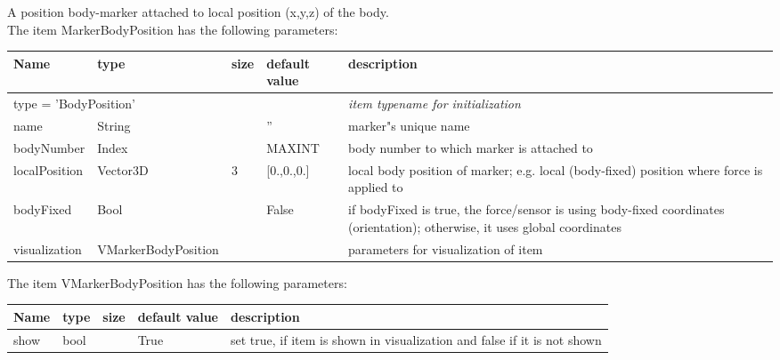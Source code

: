 A position body-marker attached to local position (x,y,z) of the body.
 \\The item MarkerBodyPosition has the following parameters:
\begin{center}
  \footnotesize
  \begin{longtable}{| p{4.5cm} | p{2.5cm} | p{0.5cm} | p{2.5cm} | p{6cm} |}
    \hline
    \bf Name & \bf type & \bf size & \bf default value & \bf description \\ \hline
    \multicolumn{4}{l}{\parbox{10cm}{type = 'BodyPosition'}} & \multicolumn{1}{l}{\parbox{6cm}{\it item typename for initialization}}\\ \hline
    name &     String &      &     '' &     marker"s unique name\\ \hline
    bodyNumber &     Index &      &     MAXINT &     body number to which marker is attached to\\ \hline
    localPosition &     Vector3D &     3 &     [0.,0.,0.] &     local body position of marker; e.g. local (body-fixed) position where force is applied to\\ \hline
    bodyFixed &     Bool &      &     False &     if bodyFixed is true, the force/sensor is using body-fixed coordinates (orientation); otherwise, it uses global coordinates\\ \hline
    visualization & VMarkerBodyPosition & & & parameters for visualization of item \\ \hline
	  \end{longtable}
	\end{center}
The item VMarkerBodyPosition has the following parameters:
\begin{center}
  \footnotesize
  \begin{longtable}{| p{4.5cm} | p{2.5cm} | p{0.5cm} | p{2.5cm} | p{6cm} |}
    \hline
    \bf Name & \bf type & \bf size & \bf default value & \bf description \\ \hline
    show &     bool &      &     True &     set true, if item is shown in visualization and false if it is not shown\\ \hline
	  \end{longtable}
	\end{center}

